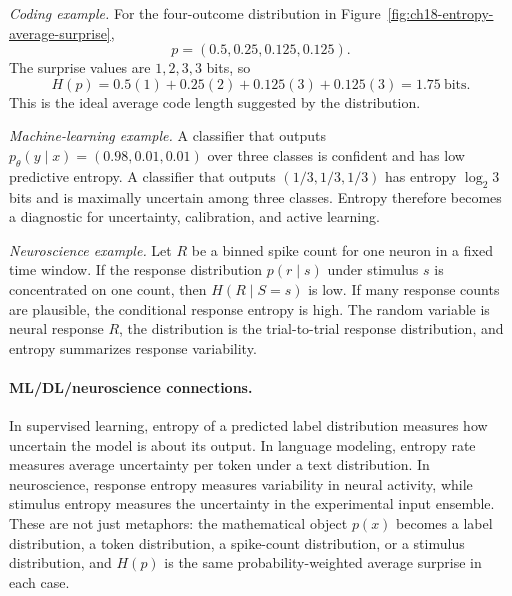\emph{Coding example.}
For the four-outcome distribution in Figure~\ref{fig:ch18-entropy-average-surprise},
\[
p=(0.5,0.25,0.125,0.125).
\]
The surprise values are \(1,2,3,3\) bits, so
\[
H(p)=0.5(1)+0.25(2)+0.125(3)+0.125(3)=1.75\ \text{bits}.
\]
This is the ideal average code length suggested by the distribution.

\emph{Machine-learning example.}
A classifier that outputs \(p_\theta(y\mid x)=(0.98,0.01,0.01)\) over three classes is confident and has low predictive entropy. A classifier that outputs \((1/3,1/3,1/3)\) has entropy \(\log_2 3\) bits and is maximally uncertain among three classes. Entropy therefore becomes a diagnostic for uncertainty, calibration, and active learning.

\emph{Neuroscience example.}
Let \(R\) be a binned spike count for one neuron in a fixed time window. If the response distribution \(p(r\mid s)\) under stimulus \(s\) is concentrated on one count, then \(H(R\mid S=s)\) is low. If many response counts are plausible, the conditional response entropy is high. The random variable is neural response \(R\), the distribution is the trial-to-trial response distribution, and entropy summarizes response variability.

\paragraph{ML/DL/neuroscience connections.}
In supervised learning, entropy of a predicted label distribution measures how uncertain the model is about its output. In language modeling, entropy rate measures average uncertainty per token under a text distribution. In neuroscience, response entropy measures variability in neural activity, while stimulus entropy measures the uncertainty in the experimental input ensemble. These are not just metaphors: the mathematical object \(p(x)\) becomes a label distribution, a token distribution, a spike-count distribution, or a stimulus distribution, and \(H(p)\) is the same probability-weighted average surprise in each case.

